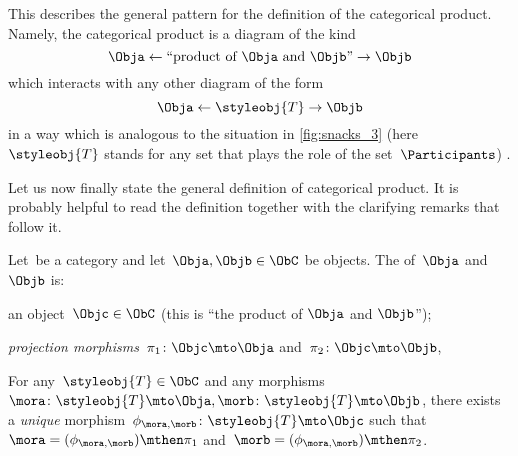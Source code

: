 This describes the general pattern for the definition of the categorical product.
Namely, the categorical product is a diagram of the kind
\begin{equation}
    \label{eq:prod-inline-generic-diagram}
    \Obja \leftarrow \text{``product of } \Obja \text{ and } \Objb \text{''}  \rightarrow \Objb
\end{equation}
which interacts with any other diagram of the form
\begin{equation}
    \label{eq:prod-inline-test-diagram}
    \Obja \leftarrow \styleobj{T} \rightarrow \Objb
\end{equation}
in a way which is analogous to the situation in \cref{fig:snacks_3} (here~$\styleobj{T}$ stands for any set that plays the role of the set~$\Participants$) .

Let us now finally state the general definition of categorical product.
It is probably helpful to read the definition together with the clarifying remarks that follow it.


\begin{ctdefinition}
    \label{def:categorical-product}
    Let~\CatC be a category and let~$\Obja, \Objb \in \ObC$ be objects.
    The \emph{} of~$\Obja$ and~$\Objb$ is: \\
    \constit
    \begin{compactenum}
        \item an object~$\Objc \in \ObC$ (this is ``the product of $\Obja$  and $\Objb$'');
        \item \emph{projection morphisms}~$\pi_1 \colon \Objc \mto \Obja$ and~$\pi_2 \colon \Objc \mto \Objb$,
    \end{compactenum}
    \condit
    \begin{compactenum}
        \item For any~$\styleobj{T} \in \ObC$ and any morphisms~$\mora \colon \styleobj{T} \mto \Obja, \morb \colon \styleobj{T} \mto \Objb$, there exists a \emph{unique} morphism~$\phi_{\mora,\morb} \colon \styleobj{T} \mto \Objc$ such that~$\mora = (\phi_{\mora,
                      \morb})\mthen \pi_1$ and~$\morb=(\phi_{\mora, \morb})\mthen \pi_2$.
    \end{compactenum}
\end{ctdefinition}

